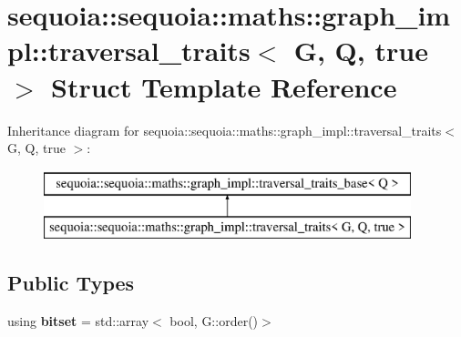 \hypertarget{structsequoia_1_1sequoia_1_1maths_1_1graph__impl_1_1traversal__traits_3_01_g_00_01_q_00_01true_01_4}{}\section{sequoia\+::sequoia\+::maths\+::graph\+\_\+impl\+::traversal\+\_\+traits$<$ G, Q, true $>$ Struct Template Reference}
\label{structsequoia_1_1sequoia_1_1maths_1_1graph__impl_1_1traversal__traits_3_01_g_00_01_q_00_01true_01_4}
Inheritance diagram for sequoia\+::sequoia\+::maths\+::graph\+\_\+impl\+::traversal\+\_\+traits$<$ G, Q, true $>$\+:\begin{figure}[H]
\begin{center}
\leavevmode
\includegraphics[height=2.000000cm]{structsequoia_1_1sequoia_1_1maths_1_1graph__impl_1_1traversal__traits_3_01_g_00_01_q_00_01true_01_4}
\end{center}
\end{figure}
\subsection*{Public Types}
\begin{DoxyCompactItemize}
\item 
\mbox{\label{structsequoia_1_1sequoia_1_1maths_1_1graph__impl_1_1traversal__traits_3_01_g_00_01_q_00_01true_01_4_a175bf7215871b2e40b1841f1e8c30f33}} 
using {\bfseries bitset} = std\+::array$<$ bool, G\+::order()$>$
\end{DoxyCompactItemize}
